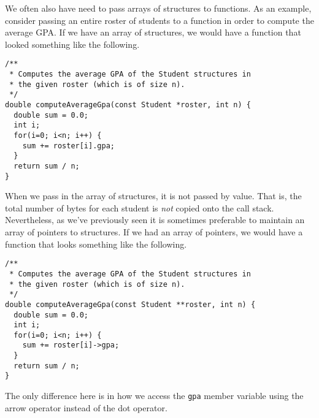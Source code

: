 We often also have need to pass arrays of structures to functions.
As an example, consider passing an entire roster of students to 
a function in order to compute the average GPA.  If we have an
array of structures, we would have a function that looked something
like the following.

\begin{verbatim}
/**
 * Computes the average GPA of the Student structures in
 * the given roster (which is of size n).
 */
double computeAverageGpa(const Student *roster, int n) {
  double sum = 0.0;
  int i;
  for(i=0; i<n; i++) {
    sum += roster[i].gpa;
  }
  return sum / n;
}
\end{verbatim}

When we pass in the array of structures, it is not passed by
value.  That is, the total number of bytes for each student is
\emph{not} copied onto the call stack.  Nevertheless, as we've
previously seen it is sometimes preferable to maintain an array
of pointers to structures.  If we had an array of pointers, we 
would have a function that looks something like the following.

\begin{verbatim}
/**
 * Computes the average GPA of the Student structures in
 * the given roster (which is of size n).
 */
double computeAverageGpa(const Student **roster, int n) {
  double sum = 0.0;
  int i;
  for(i=0; i<n; i++) {
    sum += roster[i]->gpa;
  }
  return sum / n;
}
\end{verbatim}

The only difference here is in how we access the \texttt{gpa}
member variable using the arrow operator instead of the dot 
operator.






